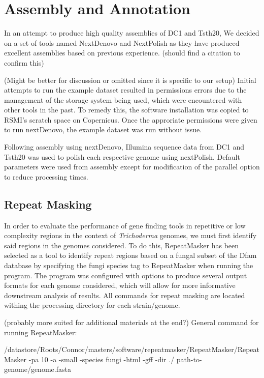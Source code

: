 \section{Assembly and Annotation}

In an attempt to produce high quality assemblies of DC1 and Tsth20, We
decided on a set of tools named NextDenovo and NextPolish as they have
produced excellent assemblies based on previous experience. (should
find a citation to confirm this)

(Might be better for discussion or omitted since it is specific to our
setup) Initial attempts to run the example dataset resulted in
permissions errors due to the management of the storage system being
used, which were encountered with other tools in the past. To remedy
this, the software installation was copied to RSMI's scratch space on
Copernicus. Once the approriate permissions were given to run
nextDenovo, the example dataset was run without issue.

Following assembly using nextDenovo, Illumina sequence data from DC1
and Tsth20 was used to polish each respective genome using
nextPolish. Default parameters were used from assembly except for
modification of the parallel option to reduce processing times.

\subsection{Repeat Masking}

In order to evaluate the performance of gene finding tools in
repetitive or low complexity regions in the context of
\textit{Trichoderma} genomes, we must first identify said regions in
the genomes considered. To do this, RepeatMasker has been selected as
a tool to identify repeat regions based on a fungal subset of the Dfam
database by specifying the fungi species tag to RepeatMasker when
running the program. The program was configured with options to
produce several output formats for each genome considered, which will
allow for more informative downstream analysis of results. All
commands for repeat masking are located withing the processing
directory for each strain/genome.

(probably more suited for additional materials at the end?)
General command for running RepeatMasker:

/datastore/Roots/Connor/masters/software/repeatmasker/RepeatMasker/RepeatMasker
-pa 10 -a -small -species fungi -html -gff -dir ./
path-to-genome/genome.fasta

